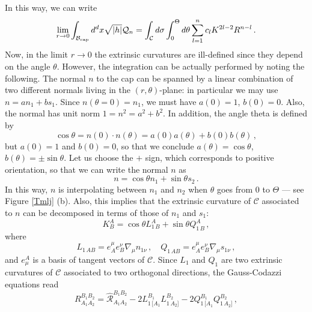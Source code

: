 \documentclass[11pt,letterpaper]{article}
\begin{document}
In this way, we can write 
\begin{equation}
\begin{aligned}
\lim_{r\rightarrow 0}\int_{\mathcal{B}_{\rm cap}}d^{d}x\sqrt{|h|}\mathcal{Q}_{n}=\int_{\mathcal{C}}d\sigma \int_{0}^{\Theta} d\theta \sum_{l=1}^{n} c_l K^{2l-2}R^{n-l}\, .
\end{aligned}
\end{equation}
Now, in the limit $r\rightarrow 0 $ the extrinsic curvatures are ill-defined since they depend  on the angle $\theta$. However, the integration can be actually performed by noting the following. The normal $n$ to the cap can be spanned by a linear combination of two different normals living in the $(r,\theta)$-plane: in particular we may use $n=a n_1+b s_1$. Since $n(\theta=0)=n_1$, we must have $a(0)=1$, $b(0)=0$. Also, the normal has unit norm $1=n^2=a^2+b^2$. In addition, the angle theta is defined by
\begin{equation}
\cos\theta=n(0)\cdot n(\theta)=a(0)a(\theta)+b(0)b(\theta)\, ,
\end{equation}
but $a(0)=1$ and $b(0)=0$, so that we conclude $a(\theta)=\cos\theta$, $b(\theta)=\pm \sin\theta$. Let us choose the $+$ sign, which corresponds to positive orientation, so that we can write the normal $n$ as
\begin{equation}
n=\cos\theta n_1+\sin\theta s_2\, .
\end{equation}
In this way, $n$ is interpolating between $n_1$ and $n_2$ when $\theta$ goes from $0$ to $\Theta$ --- see Figure \ref{Tmlj} (b). Also, this implies that the extrinsic curvature of $\mathcal{C}$ associated to $n$ can be decomposed in terms of those of $n_1$ and $s_1$:
\begin{equation}
K^{A}_{B}=\cos\theta L^{A}_{1\, B}+\sin\theta  Q^{A}_{1\, B}\, ,
\end{equation}
where 
\begin{equation}
L_{1\, AB}=e_{A}^{\mu}e_{B}^{\nu}\nabla_{\mu}n_{1\nu}\, ,\quad Q_{1\, AB}=e_{A}^{\mu}e_{B}^{\nu}\nabla_{\mu}s_{1\nu}\, ,
\end{equation}
and $e^A_{\mu}$ is a basis of tangent vectors of $\mathcal{C}$.
Since $L_1$ and $Q_1$ are two extrinsic curvatures of $\mathcal{C}$ associated to two orthogonal directions, the Gauss-Codazzi equations read
\begin{equation}\label{GC1}
R^{B_1B_2}_{A_1A_2}=\hat{\mathcal{R}}^{B_1B_2}_{A_1A_2}-2 L^{B_1}_{1\, [ A_1}L^{B_2}_{1\, A_2]}-2 Q^{B_1}_{1\, [A_1}Q^{B_2}_{1\, A_2]}\, ,
\end{equation}
\end{document}

